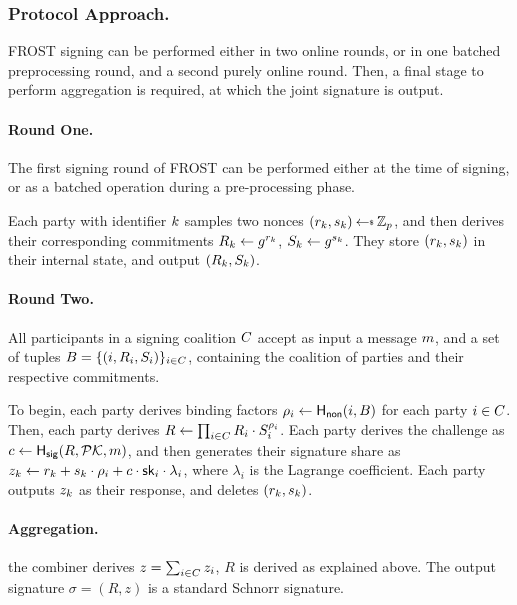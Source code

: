 \subsubsection{Protocol Approach.}

FROST signing can be performed either in two online rounds,
or in one batched preprocessing round,
and a second purely online round.
Then, a final stage to perform aggregation is required,
at which the joint signature is output.

\paragraph{Round One.}
The first signing round of FROST can be performed either at the time of signing,
or as a batched operation during a pre-processing phase.

Each party with identifier $k$ samples two nonces $(r_\partyid, s_\partyid) \randpick \Zp$,
and then derives their corresponding commitments $R_k \gets g^{r_k}$, $ S_k \gets g^{s_k}$.
They store $(r_k, s_k)$ in their internal state,
and output $(R_k, S_k)$.

\paragraph{Round Two.}
All participants in a signing coalition $C$ accept as input a message $m$,
and a set of tuples $B = \{ (i, R_i, S_i)\}_{i \in C}$,
containing the coalition of parties and their respective commitments.

To begin,
each party derives binding factors $\rho_i \gets \mathsf{H_{non}}(i, B)$ for each party $i \in C$.
Then, each party derives $R \gets \prod_{i \in C} R_i \cdot S_i^{\rho_i}$.
Each party derives the challenge as $c \gets \mathsf{H_{sig}}(R, \mathcal{PK}, m)$,
and then generates their signature share as
$z_k \gets r_k + s_k \cdot \rho_i + c \cdot \mathsf{sk}_i \cdot \lambda_i$,
where $\lambda_i$ is the Lagrange coefficient.
Each party outputs $z_k$ as their response,
and deletes $(r_k, s_k)$.


\paragraph{Aggregation.}
the combiner derives $z = \sum_{i \in C} z_i$,
$R$ is derived as explained above.
The output signature $\sigma = (R,z)$ is a standard Schnorr signature.

